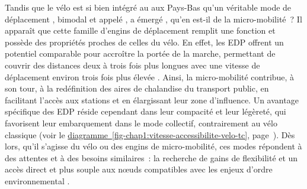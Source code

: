 \begin{refsegment}
Tandis que le vélo est si bien intégré au  aux Pays-Bas qu’un véritable mode de déplacement \textcolor{blue}{\autocite[129-148]{bruntlett_curbing_2020}}, bimodal et appelé , a émergé \textcolor{blue}{\autocite[112]{oosteren_pourquoi_2021}}, qu’en est-il de la micro-mobilité~? Il apparaît que cette famille d'engins de déplacement remplit une fonction et possède des propriétés proches de celles du vélo. En effet, les \acrshort{EDP} offrent un potentiel comparable pour accroître la portée de la marche, permettant de couvrir des distances deux à trois fois plus longues avec une vitesse de déplacement environ trois fois plus élevée \textcolor{blue}{\autocite{rabaud_micromobilites_2019}}. Ainsi, la micro-mobilité contribue, à son tour, à la redéfinition des aires de chalandise du transport public, en facilitant l’accès aux stations et en élargissant leur zone d’influence. Un avantage spécifique des \acrshort{EDP} réside cependant dans leur compacité et leur légèreté, qui favorisent leur embarquement dans le mode collectif, contrairement au vélo classique (voir le \hyperref[fig-chap1:vitesse-accessibilite-velo-tc]{diagramme~\ref{fig-chap1:vitesse-accessibilite-velo-tc}}, page~\pageref{fig-chap1:vitesse-accessibilite-velo-tc}). Dès lors, qu’il s’agisse du vélo ou des engins de micro-mobilité, ces modes répondent à des attentes et à des besoins similaires~: la recherche de gains de flexibilité et un accès direct et plus souple aux nœuds compatibles avec les enjeux d'ordre environnemental \textcolor{blue}{\autocite[80]{oostendorp_combining_2018}}.%


\end{refsegment}
